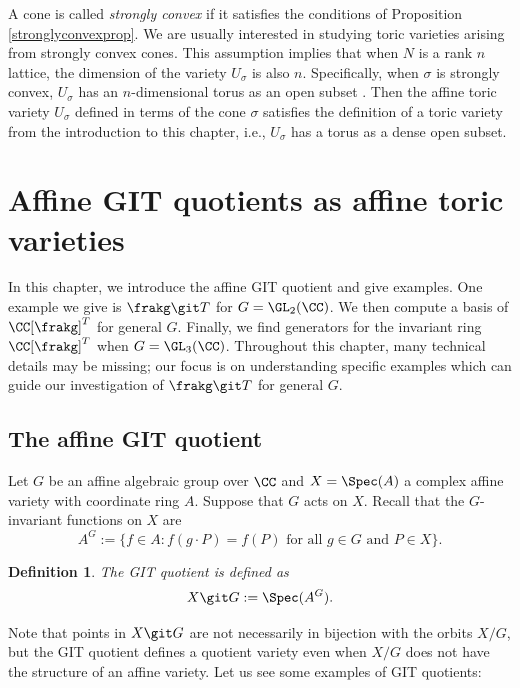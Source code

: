 \documentclass[12pt]{amsart}
\theoremstyle{plain}
\newtheorem{definition}[theorem]{Definition}
\begin{document}
A cone is called \emph{strongly convex} if it satisfies the conditions of Proposition \ref{stronglyconvexprop}.
We are usually interested in studying toric varieties arising from strongly convex cones.
This assumption implies that when $N$ is a rank $n$ lattice, the dimension of the variety $U_\sigma$ is also $n$.
Specifically, when $\sigma$ is strongly convex, $U_\sigma$ has an $n$-dimensional torus as an open subset \cite[Theorem 1.2.18]{CLS11}.
Then the affine toric variety $U_\sigma$ defined in terms of the cone $\sigma$ satisfies the definition of a toric variety from the introduction to this chapter, i.e., $U_\sigma$ has a torus as a dense open subset.

\newpage
\section{Affine GIT quotients as affine toric varieties}
In this chapter, we introduce the affine GIT quotient and give examples.
One example we give is $\frakg \git T$ for $G = \GL_2(\CC)$.
We then compute a basis of $\CC[\frakg]^T$ for general $G$.
Finally, we find generators for the invariant ring $\CC[\frakg]^T$ when $G = \GL_3(\CC)$.
Throughout this chapter, many technical details may be missing;
our focus is on understanding specific examples which can guide our investigation of $\frakg \git T$ for general $G$.

\subsection{The affine GIT quotient}
Let $G$ be an affine algebraic group over $\CC$ and $X = \Spec(A)$ a complex affine variety with coordinate ring $A$.
Suppose that $G$ acts on $X$.
Recall that the $G$-invariant functions on $X$ are
$$A^G := \{f \in A : f(g \cdot P) = f(P) \text{ for all } g \in G \text{ and } P \in X\}.$$

\begin{definition}
The GIT quotient is defined as
$$X \git G := \Spec(A^G).$$
\end{definition}

Note that points in $X \git G$ are not necessarily in bijection with the orbits $X / G$, but the GIT quotient defines a quotient variety even when $X / G$ does not have the structure of an affine variety.
Let us see some examples of GIT quotients:
\end{document}
